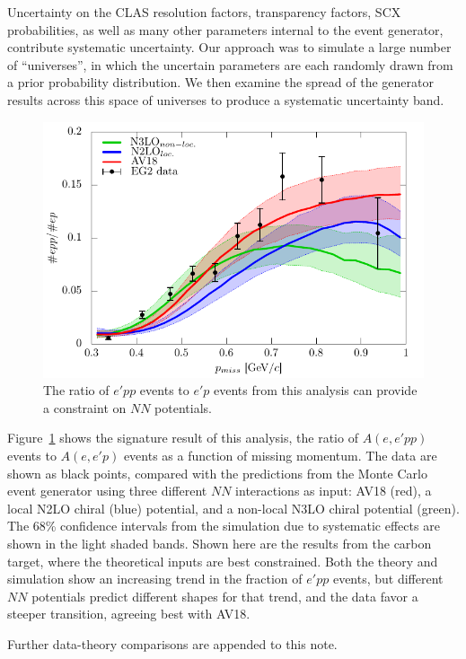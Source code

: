 \documentclass{article}
\begin{document}
Uncertainty on the CLAS resolution factors, transparency factors, SCX probabilities, 
as well as many other parameters internal to the event generator,
contribute systematic uncertainty. Our approach was to simulate a large number of 
``universes'', in which the uncertain parameters are each randomly drawn from a prior probability
distribution. We then examine the spread of the generator results across this space
of universes to produce a systematic uncertainty band.

\begin{figure}[htpb]
\centering
\includegraphics[width=12cm]{pp2p.pdf}
\caption[$e'pp/e'p$]{The ratio of $e'pp$ events to $e'p$ events from this analysis can 
provide a constraint on $NN$ potentials.
\label{fig:pp2p}
}
\end{figure}

Figure~\ref{fig:pp2p} shows the signature result of this analysis, the ratio of
$A(e,e'pp)$ events to $A(e,e'p)$ events as a function of missing momentum. The data
are shown as black points, compared with the predictions from the Monte Carlo event
generator using three different $NN$ interactions as input: AV18 (red), a local N2LO chiral (blue)
potential, and a non-local N3LO chiral potential (green). The 68\% confidence intervals
from the simulation due to systematic effects are shown in the light shaded bands. 
Shown here are the results from the carbon target, where the theoretical inputs are
best constrained. Both the theory and simulation show an increasing trend in the
fraction of $e'pp$ events, but different $NN$ potentials predict different shapes
for that trend, and the data favor a steeper transition, agreeing best with AV18. 

Further data-theory comparisons are appended to this note.




\clearpage

\end{document}
